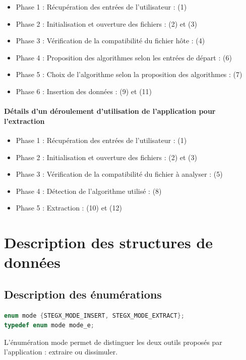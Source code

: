 \documentclass[11pt]{article}
\begin{document}
\begin{itemize}
\item Phase 1 : Récupération des entrées de l'utilisateur : (1)
\item Phase 2 : Initialisation et ouverture des fichiers : (2) et (3)
\item Phase 3 : Vérification de la compatibilité du fichier hôte : (4)
\item Phase 4 : Proposition des algorithmes selon les entrées de départ : 
(6)
\item Phase 5 : Choix de l'algorithme selon la proposition des algorithmes : 
(7)
\item Phase 6 : Insertion des données : (9) et (11)
\end{itemize}

\paragraph{Détails d'un déroulement d'utilisation de l'application pour 
l'extraction}

\begin{itemize}
\item Phase 1 : Récupération des entrées de l'utilisateur : (1)
\item Phase 2 : Initialisation et ouverture des fichiers : (2) et (3)
\item Phase 3 : Vérification de la compatibilité du fichier à analyser : 
(5)
\item Phase 4 : Détection de l'algorithme utilisé : (8)
\item Phase 5 : Extraction : (10) et (12)
\end{itemize}
\newpage

\section{Description des structures de données}

\subsection{Description des énumérations}

\begin{lstlisting}[language=c]
enum mode {STEGX_MODE_INSERT, STEGX_MODE_EXTRACT};
typedef enum mode mode_e;
\end{lstlisting}

L'énumération mode permet de distinguer les deux outils proposés par 
l'application : extraire ou dissimuler. 
\newline
\end{document}
